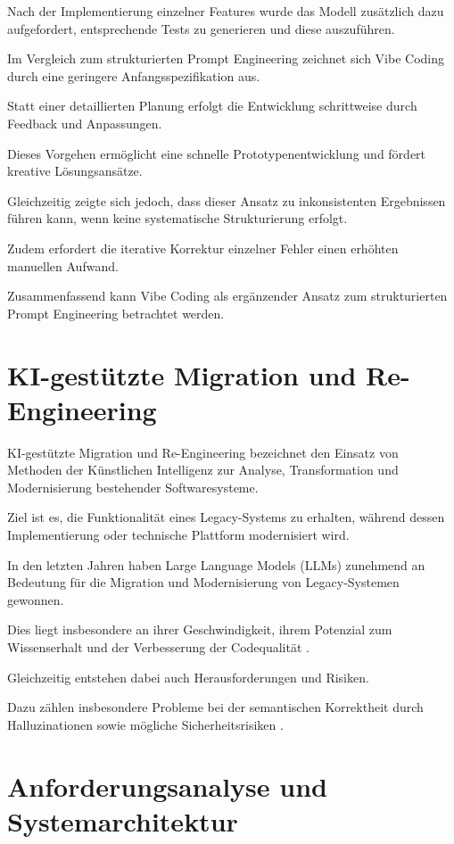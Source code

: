 Nach der Implementierung einzelner Features wurde das
Modell zusätzlich dazu aufgefordert, entsprechende
Tests zu generieren und diese auszuführen.

Im Vergleich zum strukturierten Prompt Engineering
zeichnet sich Vibe Coding durch eine geringere
Anfangsspezifikation aus.

Statt einer detaillierten Planung erfolgt die
Entwicklung schrittweise durch Feedback und Anpassungen.

Dieses Vorgehen ermöglicht eine schnelle
Prototypenentwicklung und fördert kreative
Lösungsansätze.

Gleichzeitig zeigte sich jedoch, dass dieser Ansatz zu
inkonsistenten Ergebnissen führen kann, wenn keine
systematische Strukturierung erfolgt.

Zudem erfordert die iterative Korrektur einzelner
Fehler einen erhöhten manuellen Aufwand.

Zusammenfassend kann Vibe Coding als ergänzender Ansatz
zum strukturierten Prompt Engineering betrachtet
werden.


\section{KI-gestützte Migration und Re-Engineering}

KI-gestützte Migration und Re-Engineering bezeichnet
den Einsatz von Methoden der Künstlichen Intelligenz
zur Analyse, Transformation und Modernisierung
bestehender Softwaresysteme.

Ziel ist es, die Funktionalität eines Legacy-Systems
zu erhalten, während dessen Implementierung oder
technische Plattform modernisiert wird.

In den letzten Jahren haben Large Language Models
(LLMs) zunehmend an Bedeutung für die Migration und
Modernisierung von Legacy-Systemen gewonnen.

Dies liegt insbesondere an ihrer Geschwindigkeit,
ihrem Potenzial zum Wissenserhalt und der
Verbesserung der Codequalität \cite{agarwal2024legacy}.

Gleichzeitig entstehen dabei auch Herausforderungen
und Risiken.

Dazu zählen insbesondere Probleme bei der semantischen
Korrektheit durch Halluzinationen sowie mögliche
Sicherheitsrisiken \cite{chen2021evaluatinglargelanguagemodels}.

\section{Anforderungsanalyse und Systemarchitektur}


